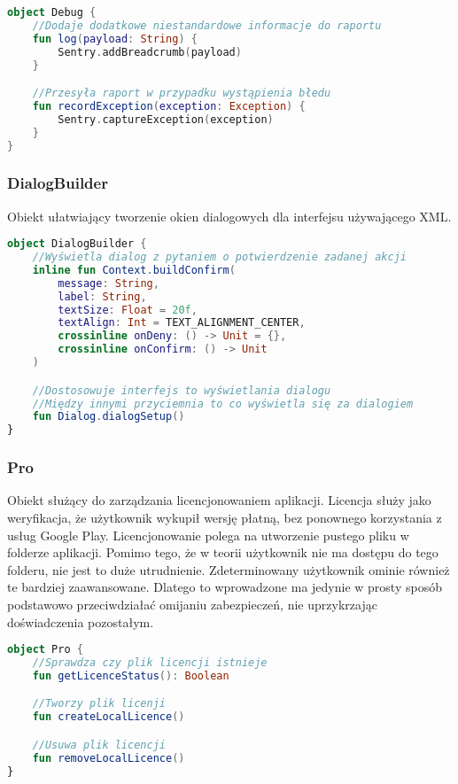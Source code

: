 \begin{lstlisting}[language=Kotlin]
object Debug {
    //Dodaje dodatkowe niestandardowe informacje do raportu
    fun log(payload: String) {
        Sentry.addBreadcrumb(payload)
    }

    //Przesyła raport w przypadku wystąpienia błedu
    fun recordException(exception: Exception) {
        Sentry.captureException(exception)
    }
}
\end{lstlisting}

\subsubsection{DialogBuilder}
Obiekt ułatwiający tworzenie okien dialogowych dla interfejsu używającego XML.

\begin{lstlisting}[language=Kotlin]
object DialogBuilder {
    //Wyświetla dialog z pytaniem o potwierdzenie zadanej akcji
    inline fun Context.buildConfirm(
        message: String,
        label: String,
        textSize: Float = 20f,
        textAlign: Int = TEXT_ALIGNMENT_CENTER,
        crossinline onDeny: () -> Unit = {},
        crossinline onConfirm: () -> Unit
    )

    //Dostosowuje interfejs to wyświetlania dialogu
    //Między innymi przyciemnia to co wyświetla się za dialogiem
    fun Dialog.dialogSetup()
}
\end{lstlisting}

\newpage

\subsubsection{Pro}
Obiekt służący do zarządzania licencjonowaniem aplikacji. Licencja służy jako weryfikacja, że użytkownik wykupił wersję płatną, bez ponownego korzystania z usług Google Play. Licencjonowanie polega na utworzenie pustego pliku w folderze aplikacji. Pomimo tego, że w teorii użytkownik nie ma dostępu do tego folderu, nie jest to duże utrudnienie. Zdeterminowany użytkownik ominie również te bardziej zaawansowane. Dlatego to wprowadzone ma jedynie w prosty sposób podstawowo przeciwdziałać omijaniu zabezpieczeń, nie uprzykrzając doświadczenia pozostałym.

\begin{lstlisting}[language=Kotlin]
object Pro {
    //Sprawdza czy plik licencji istnieje
    fun getLicenceStatus(): Boolean

    //Tworzy plik licenji
    fun createLocalLicence()

    //Usuwa plik licencji
    fun removeLocalLicence()
}
\end{lstlisting}

